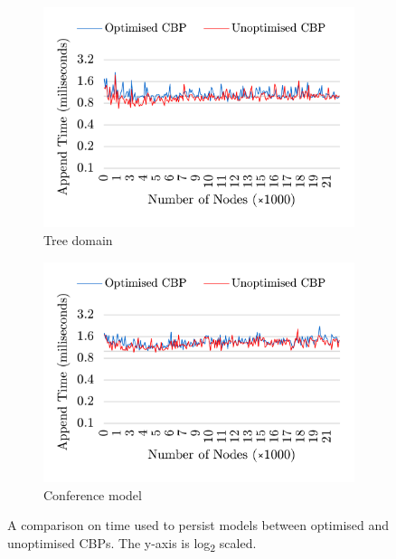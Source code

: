 \documentclass{llncs}
\begin{document}
\begin{figure}[ht]	
	\begin{subfigure}[t]{0.5\linewidth}
		\includegraphics[width=\linewidth]{append_speed_tree}
		\caption{Tree domain}\label{fig:append_speed_tree}		
	\end{subfigure}
	\hfill
	\begin{subfigure}[t]{0.5\linewidth}
		\includegraphics[width=\linewidth]{append_speed_conf}
		\caption{Conference model}\label{fig:append_speed_conference}
	\end{subfigure}
	\caption{A comparison on time used to persist models between optimised and unoptimised CBPs. The y-axis is log\textsubscript{2} scaled.}
	\label{fig:append_speed}
\end{figure}
\end{document}
